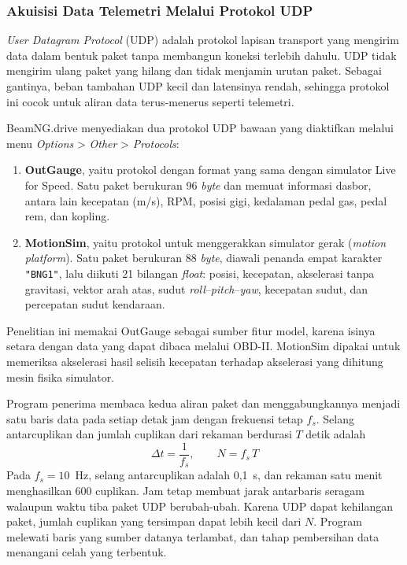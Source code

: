 \subsubsection{Akuisisi Data Telemetri Melalui Protokol UDP}
\textit{User Datagram Protocol} (UDP) adalah protokol lapisan transport yang mengirim data dalam bentuk paket tanpa membangun koneksi terlebih dahulu. UDP tidak mengirim ulang paket yang hilang dan tidak menjamin urutan paket. Sebagai gantinya, beban tambahan UDP kecil dan latensinya rendah, sehingga protokol ini cocok untuk aliran data terus-menerus seperti telemetri.

BeamNG.drive menyediakan dua protokol UDP bawaan yang diaktifkan melalui menu \textit{Options} \textgreater{} \textit{Other} \textgreater{} \textit{Protocols}:
\begin{enumerate}
  \item \textbf{OutGauge}, yaitu protokol dengan format yang sama dengan simulator Live for Speed. Satu paket berukuran 96 \textit{byte} dan memuat informasi dasbor, antara lain kecepatan (m/s), RPM, posisi gigi, kedalaman pedal gas, pedal rem, dan kopling.
  \item \textbf{MotionSim}, yaitu protokol untuk menggerakkan simulator gerak (\textit{motion platform}). Satu paket berukuran 88 \textit{byte}, diawali penanda empat karakter \texttt{"BNG1"}, lalu diikuti 21 bilangan \textit{float}: posisi, kecepatan, akselerasi tanpa gravitasi, vektor arah atas, sudut \textit{roll}--\textit{pitch}--\textit{yaw}, kecepatan sudut, dan percepatan sudut kendaraan.
\end{enumerate}
Penelitian ini memakai OutGauge sebagai sumber fitur model, karena isinya setara dengan data yang dapat dibaca melalui OBD-II. MotionSim dipakai untuk memeriksa akselerasi hasil selisih kecepatan terhadap akselerasi yang dihitung mesin fisika simulator.

Program penerima membaca kedua aliran paket dan menggabungkannya menjadi satu baris data pada setiap detak jam dengan frekuensi tetap $f_{s}$. Selang antarcuplikan dan jumlah cuplikan dari rekaman berdurasi $T$ detik adalah
\begin{equation}
  \Delta t = \frac{1}{f_{s}}, \qquad N = f_{s}\,T
  \label{eq:fs}
\end{equation}
Pada $f_{s} = 10$~Hz, selang antarcuplikan adalah 0,1~s, dan rekaman satu menit menghasilkan 600 cuplikan. Jam tetap membuat jarak antarbaris seragam walaupun waktu tiba paket UDP berubah-ubah. Karena UDP dapat kehilangan paket, jumlah cuplikan yang tersimpan dapat lebih kecil dari $N$. Program melewati baris yang sumber datanya terlambat, dan tahap pembersihan data menangani celah yang terbentuk.

